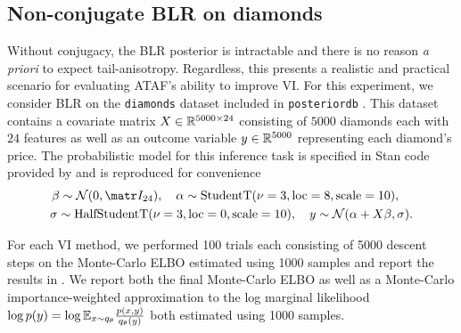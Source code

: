 \documentclass{article}
\theoremstyle{definition}
\theoremstyle{remark}
\begin{document}
\subsection{Non-conjugate BLR on diamonds}
\label{ssec:diamonds}

Without conjugacy, the BLR posterior is intractable and there is no reason \emph{a priori} to expect tail-anisotropy.
Regardless, this presents a realistic and practical scenario for evaluating ATAF's ability to improve VI.
For this experiment, we consider BLR on the \texttt{diamonds} dataset \citep{wickham2011ggplot2} included in
\texttt{posteriordb} \citep{ghposteriordb}.
This dataset contains a covariate matrix $X \in \mathbb{R}^{5000 \times 24}$ consisting of $5000$
diamonds each with $24$ features as well as an outcome variable $y \in \mathbb{R}^{5000}$ representing each diamond's price.
The probabilistic model for this inference task is specified in Stan code provided by \citep{ghposteriordb} and is reproduced
for convenience
\begin{gather*}
    \beta \sim \cN(0, \mI_{24}),\quad
    \alpha \sim \text{StudentT}(\nu=3, \text{loc}=8, \text{scale}=10),\quad\\
    \sigma \sim \text{HalfStudentT}(\nu=3, \text{loc}=0, \text{scale}=10),\quad
    y \sim \cN(\alpha + X \beta, \sigma).
\end{gather*}

For each VI method, we performed 100 trials each consisting of 5000 descent steps
on the Monte-Carlo ELBO estimated using 1000 samples and report the results in
. We report both the final Monte-Carlo ELBO
as well as a Monte-Carlo importance-weighted approximation to
the log marginal likelihood $\log p(y) = \log \mathbb{E}_{x \sim q_\theta} \frac{p(x,y)}{q_\theta(y)}$
both estimated using 1000 samples.






\end{document}
